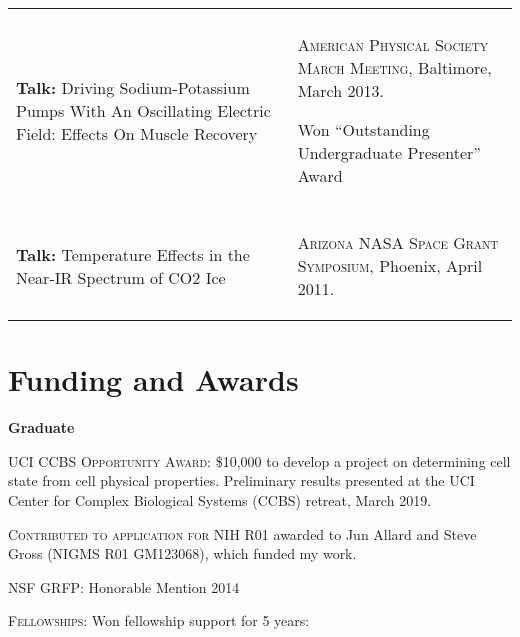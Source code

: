 \documentclass[letterpaper,10pt]{article} %
\makeatletter
\newcommand\cellwidth{\TX@col@width}
\makeatother
\begin{document}
\begin{tabularx}{\textwidth}{p{} | X}
\multicolumn{2}{c}{} \\

\begin{minipage}{.4\textwidth}
\textbf{Talk:} Driving Sodium-Potassium Pumps With An Oscillating Electric Field: Effects On Muscle Recovery
\end{minipage}
&
\begin{minipage}{\cellwidth}
\begin{description}[itemsep=.25ex,labelsep=0em]
\item \textsc{American Physical Society March Meeting}, Baltimore, March 2013.
\item Won ``Outstanding Undergraduate Presenter'' Award
\end{description}
\end{minipage} \\

\multicolumn{2}{c}{} \\

\begin{minipage}{.4\textwidth}
\textbf{Talk:} Temperature Effects in the Near-IR Spectrum of CO2 Ice
\end{minipage}
&
\begin{minipage}{\cellwidth}
\begin{description}[itemsep=.25ex,labelsep=0em]
\item \textsc{Arizona NASA Space Grant Symposium}, Phoenix, April 2011.
\end{description}
\end{minipage}
\end{tabularx}

\bigskip
\section*{Funding and Awards}
\bigskip

{\large \textbf{Graduate}}

\begin{description}[itemsep=-1ex]
\item \textsc{UCI CCBS Opportunity Award}: \$10,000 to develop a project on determining cell state from cell physical properties. Preliminary results presented at the UCI Center for Complex Biological Systems (CCBS) retreat, March 2019.
\item \textsc{Contributed to application for NIH R01} awarded to Jun Allard and Steve Gross (NIGMS R01 GM123068), which funded my work.
\item \textsc{NSF GRFP}: Honorable Mention 2014
\item \textsc{Fellowships}: Won fellowship support for 5 years:
\end{description}
\end{document}
